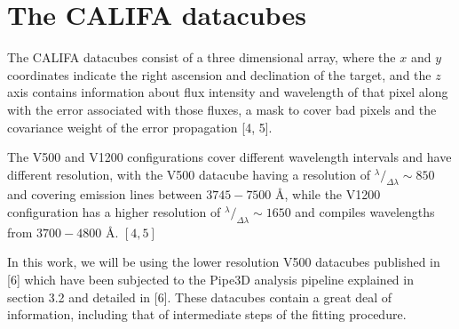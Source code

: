 \section{The CALIFA datacubes}

The CALIFA datacubes consist of a three dimensional array, where the $x$ and $y$ coordinates indicate the right ascension and
declination of the target, and the $z$ axis contains information about flux intensity and wavelength of that pixel along with the
error associated with those fluxes, a mask to cover bad pixels and the covariance weight of the error propagation [4, 5].

The V500 and V1200 configurations cover different wavelength intervals and have different resolution, with the V500 datacube having
a resolution of $^{\lambda}/_{\Delta \lambda} \sim 850$ and covering emission lines between $3745 - 7500$ \AA, while the V1200
configuration has a higher resolution of $^{\lambda}/_{\Delta \lambda} \sim 1650$ and compiles wavelengths from $3700 - 4800$ \AA.
$\left[4, 5\right]$

In this work, we will be using the lower resolution V500 datacubes published in [6] which have been subjected to the Pipe3D analysis
pipeline explained in section 3.2 and detailed in [6]. These datacubes contain a great deal of information, including that of
intermediate steps of the fitting procedure.
